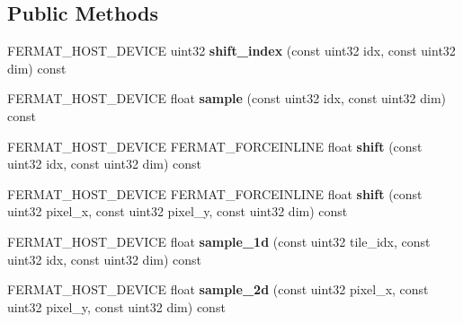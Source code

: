 \subsection*{Public Methods}
\begin{DoxyCompactItemize}
\item 
\mbox{\label{struct_tiled_sequence_view_a94c00d57e91280fcf46ab4afba7b4d12}} 
F\+E\+R\+M\+A\+T\+\_\+\+H\+O\+S\+T\+\_\+\+D\+E\+V\+I\+CE uint32 {\bfseries shift\+\_\+index} (const uint32 idx, const uint32 dim) const
\item 
\mbox{\label{struct_tiled_sequence_view_ae47506c753bd6036a31e011bac010a85}} 
F\+E\+R\+M\+A\+T\+\_\+\+H\+O\+S\+T\+\_\+\+D\+E\+V\+I\+CE float {\bfseries sample} (const uint32 idx, const uint32 dim) const
\item 
\mbox{\label{struct_tiled_sequence_view_ade3dac7c05205c7bd7d69fba750dfbab}} 
F\+E\+R\+M\+A\+T\+\_\+\+H\+O\+S\+T\+\_\+\+D\+E\+V\+I\+CE F\+E\+R\+M\+A\+T\+\_\+\+F\+O\+R\+C\+E\+I\+N\+L\+I\+NE float {\bfseries shift} (const uint32 idx, const uint32 dim) const
\item 
\mbox{\label{struct_tiled_sequence_view_ab221bfbf4b7fc8eaa42a5b17281f182e}} 
F\+E\+R\+M\+A\+T\+\_\+\+H\+O\+S\+T\+\_\+\+D\+E\+V\+I\+CE F\+E\+R\+M\+A\+T\+\_\+\+F\+O\+R\+C\+E\+I\+N\+L\+I\+NE float {\bfseries shift} (const uint32 pixel\+\_\+x, const uint32 pixel\+\_\+y, const uint32 dim) const
\item 
\mbox{\label{struct_tiled_sequence_view_a67088ceab693ec7de0fcb7860efb5a14}} 
F\+E\+R\+M\+A\+T\+\_\+\+H\+O\+S\+T\+\_\+\+D\+E\+V\+I\+CE float {\bfseries sample\+\_\+1d} (const uint32 tile\+\_\+idx, const uint32 idx, const uint32 dim) const
\item 
\mbox{\label{struct_tiled_sequence_view_ae76fdb905c7181ceb69d2de6b6b90ca9}} 
F\+E\+R\+M\+A\+T\+\_\+\+H\+O\+S\+T\+\_\+\+D\+E\+V\+I\+CE float {\bfseries sample\+\_\+2d} (const uint32 pixel\+\_\+x, const uint32 pixel\+\_\+y, const uint32 dim) const
\end{DoxyCompactItemize}

